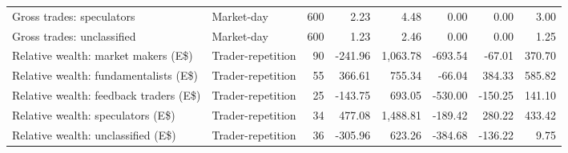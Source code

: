 \begin{tabular}{llrrrrrr}
Gross trades: speculators & Market-day & 600 & 2.23 & 4.48 & 0.00 & 0.00 & 3.00 \\
Gross trades: unclassified & Market-day & 600 & 1.23 & 2.46 & 0.00 & 0.00 & 1.25 \\
Relative wealth: market makers (E\$) & Trader-repetition & 90 & -241.96 & 1,063.78 & -693.54 & -67.01 & 370.70 \\
Relative wealth: fundamentalists (E\$) & Trader-repetition & 55 & 366.61 & 755.34 & -66.04 & 384.33 & 585.82 \\
Relative wealth: feedback traders (E\$) & Trader-repetition & 25 & -143.75 & 693.05 & -530.00 & -150.25 & 141.10 \\
Relative wealth: speculators (E\$) & Trader-repetition & 34 & 477.08 & 1,488.81 & -189.42 & 280.22 & 433.42 \\
Relative wealth: unclassified (E\$) & Trader-repetition & 36 & -305.96 & 623.26 & -384.68 & -136.22 & 9.75 \\
\bottomrule
\end{tabular}
